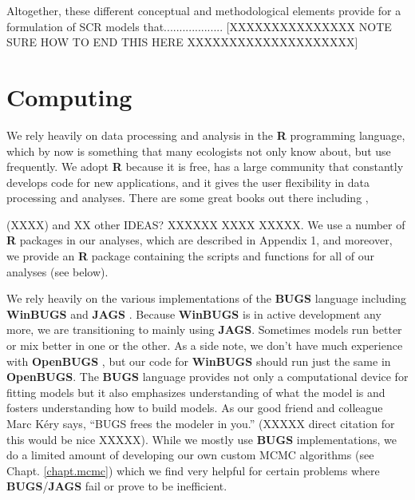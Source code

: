 Altogether, these different conceptual and methodological elements
provide for a formulation of SCR models that...................
[XXXXXXXXXXXXXXX NOTE SURE HOW TO END THIS HERE XXXXXXXXXXXXXXXXXXXX]


\section*{Computing}

We rely heavily on data processing and analysis in the {\bf R}
programming language, which by now is something that many ecologists
not only know about, but use frequently.  We adopt {\bf R} because it
is free, has a large community that constantly develops code for new
applications, and it gives the user flexibility in data processing and
analyses.  There are some great books out there including \citep{bolker:2008},

(XXXX) and XX other IDEAS? XXXXXX XXXX XXXXX. We use a number of {\bf
  R} packages in our analyses, which are described in Appendix 1, and
moreover, we provide an {\bf R} package containing the scripts and
functions for all of our analyses (see below).

We rely heavily on the various implementations of the {\bf BUGS}
language including {\bf WinBUGS} \citep{lunn_etal:2000} and {\bf JAGS}
\citep{plummer:2003}.  Because {\bf WinBUGS} is in active development
any more, we are transitioning to mainly using {\bf JAGS}.  Sometimes
models run better or mix better in one or the other. As a side note,
we don't have much experience with {\bf OpenBUGS}
\citep{thomas_etal:2006}, but our code for {\bf WinBUGS} should run
just the same in {\bf OpenBUGS}. The {\bf BUGS} language provides not
only a computational device for fitting models but it also emphasizes
understanding of what the model is and fosters understanding how to
build models.  As our good friend and colleague Marc K\'{e}ry says,
``BUGS frees the modeler in you.''  (XXXXX direct citation for this
would be nice XXXXX).  While we mostly use {\bf BUGS} implementations,
we do a limited amount of developing our own custom MCMC algorithms
(see Chapt. \ref{chapt.mcmc}) which we find very helpful for certain
problems where {\bf BUGS}/{\bf JAGS} fail or prove to be inefficient.

